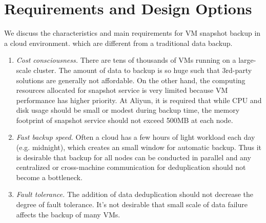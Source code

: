 \section{Requirements and Design Options}
\label{sect:options}

We discuss the characteristics and 
main requirements for VM snapshot backup in a cloud environment.
which are different from a traditional data backup. 
\begin{enumerate}
\item {\em Cost consciousness.}
There are tens of thousands of VMs running on a large-scale cluster. 
The amount of data to backup is so huge such that 3rd-party solutions are generally not affordable.
On the other hand, the computing resources allocated for snapshot service is very limited
because VM performance has higher priority.  
At Aliyun, it is required that while CPU and disk usage should be small or modest during backup time,
the memory footprint of snapshot service should not exceed 500MB at each node.

\item {\em Fast backup speed.}
Often a cloud has a few hours of light workload each day (e.g. midnight),  which creates an small window for automatic backup.
Thus it is desirable that backup for all nodes
can be conducted in parallel and any centralized or  cross-machine communication for
deduplication should not become a bottleneck.

\item {\em Fault tolerance.}
The addition of data deduplication should not decrease the degree of
fault tolerance. It's not desirable that small scale of data failure affects the backup of many VMs.
\end{enumerate}

